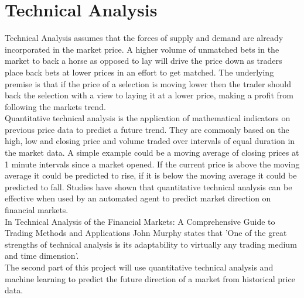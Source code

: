\section{Technical Analysis}
	Technical Analysis assumes that the forces of supply and demand are already incorporated in the market price. A higher volume of unmatched bets in the market to back a horse as opposed to lay will drive the price down as traders place back bets at lower prices in an effort to get matched. The underlying premise is that if the price of a selection is moving lower then the trader should back the selection with a view to laying it at a lower price, making a profit from following the markets trend.\\ 
	
	Quantitative technical analysis is the application of mathematical indicators on previous price data to predict a future trend. They are commonly based on the high, low and closing price and volume traded over intervals of equal duration in the market data. A simple example could be a moving average of closing prices at 1 minute intervals since a market opened. If the current price is above the moving average it could be predicted to rise, if it is below the moving average it could be predicted to fall. Studies have shown that quantitative technical analysis can be effective when used by an automated agent to predict market direction on financial markets\cite{schoreels2004agent}.\\
	
	In Technical Analysis of the Financial Markets: A Comprehensive Guide to Trading Methods and Applications\cite{murphy1999technical} John Murphy states that 'One of the great strengths of technical analysis is its adaptability to virtually any trading medium and time dimension'.\\ 
	
	The second part of this project will use quantitative technical analysis and machine learning to predict the future direction of a market from historical price data.